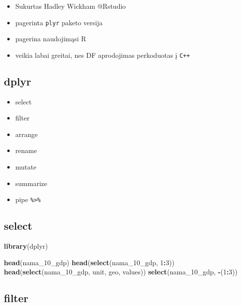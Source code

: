 \documentclass[]{article}
\newenvironment{Shaded}{\begin{snugshade}}{\end{snugshade}}
\newcommand{\KeywordTok}[1]{\textcolor[rgb]{0.13,0.29,0.53}{\textbf{#1}}}
\newcommand{\DecValTok}[1]{\textcolor[rgb]{0.00,0.00,0.81}{#1}}
\newcommand{\OperatorTok}[1]{\textcolor[rgb]{0.81,0.36,0.00}{\textbf{#1}}}
\newcommand{\NormalTok}[1]{#1}
\providecommand{\tightlist}{%
  \setlength{\itemsep}{0pt}\setlength{\parskip}{0pt}}
\begin{document}
\begin{itemize}
\tightlist
\item
  Sukurtas Hadley Wickham @Rstudio
\item
  pagerinta \texttt{plyr} paketo versija
\item
  pagerina naudojimąsi R
\item
  veikia labai greitai, nes DF aprodojimas perkoduotas į \texttt{C++}
\end{itemize}

\subsection{dplyr}\label{dplyr-2}

\begin{itemize}
\tightlist
\item
  select
\item
  filter
\item
  arrange
\item
  rename
\item
  mutate
\item
  summarize
\item
  pipe \texttt{\%\textgreater{}\%}
\end{itemize}

\subsection{select}\label{select}

\begin{Shaded}
\begin{Highlighting}[]
\KeywordTok{library}\NormalTok{(dplyr)}

\KeywordTok{head}\NormalTok{(nama_10_gdp)}
\KeywordTok{head}\NormalTok{(}\KeywordTok{select}\NormalTok{(nama_10_gdp, }\DecValTok{1}\OperatorTok{:}\DecValTok{3}\NormalTok{))}
\KeywordTok{head}\NormalTok{(}\KeywordTok{select}\NormalTok{(nama_10_gdp, unit, geo, values))}
\KeywordTok{select}\NormalTok{(nama_10_gdp, }\OperatorTok{-}\NormalTok{(}\DecValTok{1}\OperatorTok{:}\DecValTok{3}\NormalTok{))}
\end{Highlighting}
\end{Shaded}

\subsection{filter}\label{filter}
\end{document}
